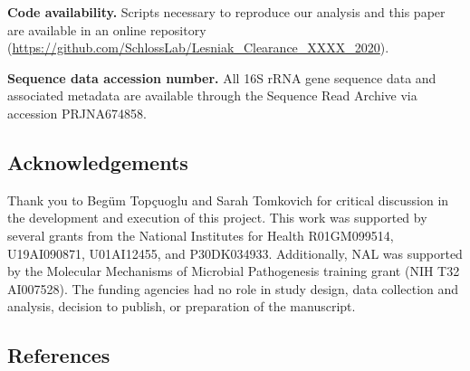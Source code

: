\documentclass[12pt,]{article}
\begin{document}
\textbf{Code availability.} Scripts necessary to reproduce our analysis
and this paper are available in an online repository
(\url{https://github.com/SchlossLab/Lesniak_Clearance_XXXX_2020}).

\textbf{Sequence data accession number.} All 16S rRNA gene sequence data
and associated metadata are available through the Sequence Read Archive
via accession PRJNA674858.

\hypertarget{acknowledgements}{%
\subsection{Acknowledgements}\label{acknowledgements}}

Thank you to Begüm Topçuoglu and Sarah Tomkovich for critical discussion
in the development and execution of this project. This work was
supported by several grants from the National Institutes for Health
R01GM099514, U19AI090871, U01AI12455, and P30DK034933. Additionally, NAL
was supported by the Molecular Mechanisms of Microbial Pathogenesis
training grant (NIH T32 AI007528). The funding agencies had no role in
study design, data collection and analysis, decision to publish, or
preparation of the manuscript.

\newpage

\hypertarget{references}{%
\subsection{References}\label{references}}
\end{document}
